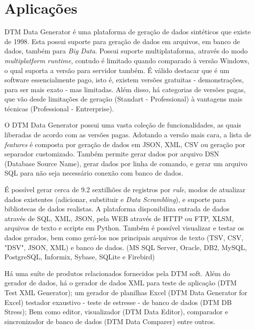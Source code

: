 \documentclass[
	12pt,				%
	openright,			%
	twoside,			%
	a4paper,			%
	english,			%
	brazil				%
	]{abntex2}
\begin{document}
	\section{Aplicações}

		DTM Data Generator \cite{DTMDataGenerator} é uma plataforma de geração de dados sintéticos que existe de 1998.
		Esta possui suporte para geração de dados em arquivos, em banco de dados, também para \emph{Big Data}.
		Possui suporte multiplataforma, através do modo \emph{multiplatform runtime}, contudo é limitado quando comparado à versão Windows, o qual suporta a versão para servidor também.
		É válido destacar que é um software essencialmente pago, isto é, existem versões gratuitas - demonstrações, para ser mais exato - mas limitadas.
		Além disso, há categorias de versões pagas, que vão desde limitações de geração (Standart - Professional) à vantagens mais técnicas (Professional - Entrerprise).
		\par
		O DTM Data Generator possui uma vasta coleção de funcionalidades, as quais liberadas de acordo com as versões pagas.
		Adotando a versão mais cara, a lista de \emph{features} é composta por geração de dados em JSON, XML, CSV ou geração por separador customizado.
		Também permite gerar dados por arquivo DSN (Database Source Name), gerar dados por linha de comando, e gerar um arquivo SQL para não seja necessário conexão com banco de dados.
		\par
		É possível gerar cerca de 9.2 sextilhões de registros por \emph{rule}, modos de atualizar dados existentes (adicionar, substituir e \emph{Data Scrambling}), e suporte para bibliotecas de dados realistas.
		A plataforma disponibiliza entrada de dados através de SQL, XML, JSON, pela WEB através de HTTP ou FTP, XLSM, arquivos de texto e scripts em Python.
		Também é possível visualizar e testar os dados gerados, bem como gerá-los nos principais arquivos de texto (TSV, CSV, "DSV", JSON, XML) e banco de dados. (MS SQL Server, Oracle, DB2, MySQL, PostgreSQL, Informix, Sybase, SQLite e Firebird) 
		\par
		Há uma suíte de produtos relacionados fornecidos pela DTM soft. 
		Além do gerador de dados, 
			há o gerador de dados XML para teste de aplicação (DTM Test XML Generator);
			um gerador de planilhas Excel (DTM Data Generator for Excel)
			testador exaustivo - teste de estresse - de banco de dados (DTM DB Stress);
			Bem como editor, visualizador (DTM Data Editor), comparador e sincronizador de banco de dados (DTM Data Comparer) entre outros. 
\end{document}
